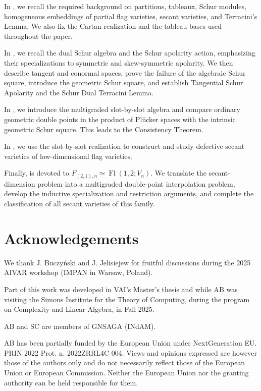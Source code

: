 \documentclass[a4paper,reqno]{amsart}
\theoremstyle{plainnopunct}
\theoremstyle{definitionnopunct}
\DeclareMathOperator{\Fl}{Fl}
\begin{document}
In , we recall the required background on
partitions, tableaux, Schur modules, homogeneous embeddings of partial
flag varieties, secant varieties, and Terracini's Lemma. We also fix
the Cartan realization and the tableau bases used throughout the
paper.

In , we recall the dual Schur
algebra and the Schur apolarity action, emphasizing their
specializations to symmetric and skew-symmetric apolarity. We then
describe tangent and conormal spaces, prove the failure of the
algebraic Schur square, introduce the geometric Schur square, and
establish Tangential Schur Apolarity and the Schur Dual Terracini
Lemma.

In , we introduce the multigraded
slot-by-slot algebra and compare ordinary geometric double points in
the product of Pl\"ucker spaces with the intrinsic geometric Schur
square. This leads to the Consistency Theorem.

In , we use the slot-by-slot realization to
construct and study defective secant varieties of low-dimensional
flag varieties.

Finally,  is devoted to $F_{(2,1),n}
\simeq
\Fl(1,2;V_n)$.
We translate the secant-dimension problem into a multigraded
double-point interpolation problem, develop the inductive
specialization and restriction arguments, and complete the
classification of all secant varieties of this family.

\section*{Acknowledgements}
\noindent We thank J. Buczyński and J. Jelisiejew for fruitful discussions during the 2025 AIVAR workshop (IMPAN in Warsaw, Poland). 

Part of this work was developed in VAI's Master's thesis \cite{IsoldiThesis} and while AB was visiting the Simons Institute for the Theory of Computing, during the program on Complexity and Linear Algebra, in Fall 2025.

AB and SC are members of GNSAGA (INdAM). 

AB has been partially funded by the European Union under NextGeneration EU. PRIN 2022 Prot. n. 2022ZRRL4C 004. Views and opinions expressed are however those of the authors only and do not necessarily reflect those of the European Union or European Commission. Neither the European Union nor the granting authority can be held responsible for them.
\end{document}

